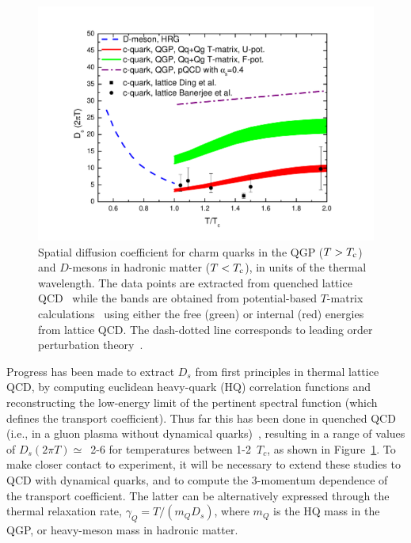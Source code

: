  \begin{figure}[tbh]
 \centerline{ \includegraphics[width=1.00\textwidth]{fig/Ds-2piT} }
 \caption[Spatial diffusion coefficient for charm quarks and $D$-mesons]{Spatial diffusion coefficient for charm quarks in the QGP ($T>T_{\rm c}$)
 and $D$-mesons in hadronic matter ($T<T_{\rm c}$), in units of the thermal wavelength.
 The data points are extracted from quenched 
 lattice QCD~\cite{Banerjee:2011ra,Ding:2012sp,Kaczmarek:2014jga} while the bands are 
 obtained from potential-based $T$-matrix calculations~\cite{Riek:2010fk,Huggins:2012dj} 
 using either the free (green) or internal (red) energies from lattice QCD. The dash-dotted 
 line corresponds to leading order perturbation theory~\cite{Svetitsky:1987gq}.
 }
 \label{fig:Ds-2piT}
 \end{figure}
 Progress has been made to extract $D_s$ from first principles in thermal lattice QCD, 
 by computing euclidean heavy-quark (HQ) correlation functions and reconstructing the 
 low-energy limit of the pertinent spectral function (which defines the transport coefficient). 
 Thus far this has been done in quenched QCD (i.e., in a gluon plasma without dynamical 
 quarks)~\cite{Banerjee:2011ra,Ding:2012sp,Kaczmarek:2014jga}, resulting in a range of 
 values of $D_s(2\pi T) \simeq$~2-6 for temperatures between 1-2~$T_c$, as shown in 
 Figure~\ref{fig:Ds-2piT}. 
 To make closer contact to experiment, it will be necessary to extend these studies 
 to QCD with dynamical quarks, and to compute the 3-momentum dependence of the transport 
 coefficient. The latter can be alternatively expressed through the thermal relaxation 
 rate, $\gamma_Q=T/(m_Q D_s)$, where $m_Q$ is the HQ mass in the QGP, or heavy-meson mass 
 in hadronic matter. 
 
